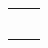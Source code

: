 \tabulinesep=1mm
\begin{longtabu} spread 0pt [c]{*2{|X[-1]}|}
\hline
 & 

\\
 & 

\\
 & 

\\
 & 

\\
 & 

\\
\end{longtabu}

